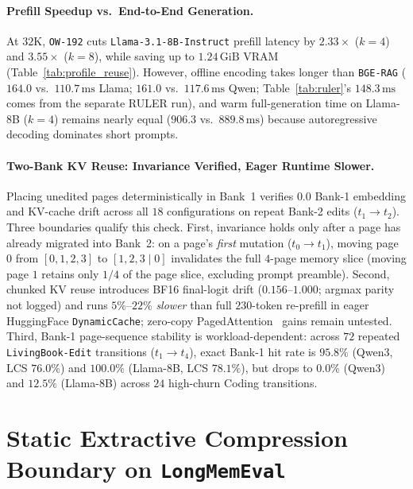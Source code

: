 \documentclass[10pt]{article}
\renewcommand{\_}{\origunderscore\allowbreak}
\begin{document}
\paragraph{Prefill Speedup vs.\ End-to-End Generation.}
At $32\text{K}$, \texttt{OW-192} cuts \texttt{Llama-3.1-8B-Instruct} prefill latency by $2.33\times$ ($k=4$) and $3.55\times$ ($k=8$), while saving up to $1.24\,\text{GiB}$ VRAM (Table~\ref{tab:profile_reuse}). However, offline encoding takes longer than \texttt{BGE-RAG} ($164.0$ vs.\ $110.7\,\text{ms}$ Llama; $161.0$ vs.\ $117.6\,\text{ms}$ Qwen; Table~\ref{tab:ruler}'s $148.3\,\text{ms}$ comes from the separate RULER run), and warm full-generation time on Llama-8B ($k=4$) remains nearly equal ($906.3$ vs.\ $889.8\,\text{ms}$) because autoregressive decoding dominates short prompts.

\paragraph{Two-Bank KV Reuse: Invariance Verified, Eager Runtime Slower.}
Placing unedited pages deterministically in Bank~1 verifies $0.0$ Bank-1 embedding and KV-cache drift across all $18$ configurations on repeat Bank-2 edits ($t_1 \rightarrow t_2$). Three boundaries qualify this check. First, invariance holds only after a page has already migrated into Bank~2: on a page's \emph{first} mutation ($t_0 \rightarrow t_1$), moving page $0$ from $[0,1,2,3]$ to $[1,2,3 \mid 0]$ invalidates the full $4$-page memory slice (moving page $1$ retains only $1/4$ of the page slice, excluding prompt preamble). Second, chunked KV reuse introduces BF16 final-logit drift ($0.156$--$1.000$; argmax parity not logged) and runs $5\%$--$22\%$ \emph{slower} than full $230$-token re-prefill in eager HuggingFace \texttt{DynamicCache}; zero-copy PagedAttention~\citep{kwon2023vllm,zheng2024sglang} gains remain untested. Third, Bank-1 page-sequence stability is workload-dependent: across $72$ repeated \texttt{LivingBook-Edit} transitions ($t_1 \rightarrow t_4$), exact Bank-1 hit rate is $95.8\%$ (Qwen3, LCS $76.0\%$) and $100.0\%$ (Llama-8B, LCS $78.1\%$), but drops to $0.0\%$ (Qwen3) and $12.5\%$ (Llama-8B) across $24$ high-churn Coding transitions.

\section{Static Extractive Compression Boundary on \texttt{LongMemEval}}
\label{sec:lme}
\end{document}
